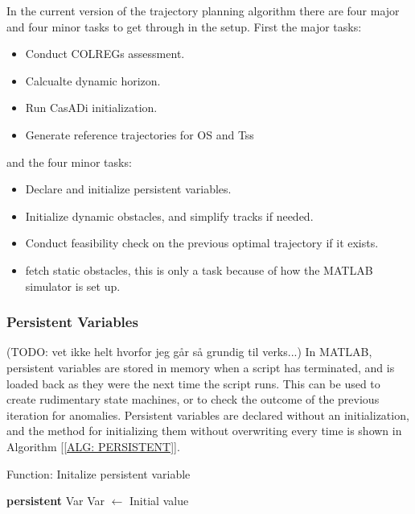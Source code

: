 In the current version of the trajectory planning algorithm there are four major and four minor tasks to get through
in the setup. First the major tasks:
\begin{itemize}
    \item Conduct COLREGs assessment.
    \item Calcualte dynamic horizon.
    \item Run CasADi initialization.
    \item Generate reference trajectories for \gls{OS} and \gls{Ts}s
\end{itemize}
and the four minor tasks:
\begin{itemize}
    \item Declare and initialize persistent variables.
    \item Initialize dynamic obstacles, and simplify tracks if needed.
    \item Conduct feasibility check on the previous optimal trajectory if it exists.
    \item fetch static obstacles, this is only a task because of how the MATLAB simulator is set up.
\end{itemize}

\subsubsection*{Persistent Variables} (TODO: vet ikke helt hvorfor jeg går så grundig til verks...)
In MATLAB, persistent variables are stored in memory when a script has terminated, and is loaded back as they were the next
time the script runs. This can be used to create rudimentary state machines, or to check the outcome of the previous iteration for anomalies.
Persistent variables are declared without an initialization, and the method for initializing them without overwriting every time is shown in Algorithm [\ref{ALG: PERSISTENT}].

\begin{algorithm}[ht]
    \caption{Function: Initalize persistent variable} \label{ALG: PERSISTENT}
    \begin{algorithmic}
        \State \textbf{persistent} Var
            \State Var $\gets$ Initial value
        \EndIf
    \end{algorithmic}
\end{algorithm}


